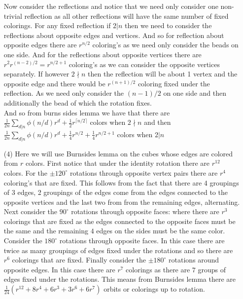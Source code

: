 \documentclass[12pt]{amsart}
\begin{document}
\begin{itemize}
Now consider the reflections and notice that we need only consider one non-trivial reflection as all other reflections will have the same number of fixed colorings. For any fixed reflection if $2|n$ then we need to consider the reflections about opposite edges and vertices. And so for reflection about opposite edges there are $r^{n/2}$ coloring's as we need only consider the beads on one side. And for the reflections about opposite vertices there are $r^{2}r^{(n-2)/2}=r^{n/2+1}$ coloring's as we can consider the opposite vertices separately. If however $2\nmid n$ then the reflection will be about 1 vertex and the opposite edge and there would be $r^{(n+1)/2}$ coloring fixed under the reflection. As we need only consider the $(n-1)/2$ on one side and then additionally the bead of which the rotation fixes.\\

And so from burns sides lemma we have that there are $\frac{1}{2n}\sum_{d|n}\phi(n/d)r^d+\frac{1}{2}r^{\lceil{n/2}\rceil}$ colors when $2\nmid n$ and then $\frac{1}{2n}\sum_{d|n}\phi(n/d)r^d+\frac{1}{4}r^{n/2}+\frac{1}{4}r^{n/2+1}$ colors when $2| n$\\


\item[(4)] %
Here we will use Burnsides lemma on the cubes whose edges are colored from $r$ colors. First notice that under the identity rotation there are $r^{12}$ colors. For the $\pm 120^\circ$ rotations through opposite vertex pairs there are $r^4$ coloring's that are fixed. This follows from the fact that there are 4 groupings of $3$ edges, 2 groupings of the edges come from the edges connected to the opposite vertices and the last two from from the remaining edges, alternating. Next consider the $90^\circ$ rotations through opposite faces: where there are $r^3$ colorings that are fixed as the edges connected to the opposite faces must be the same and the remaining $4$ edges on the sides must be the same color. Consider the $180^\circ$ rotations through opposite faces. In this case there are twice as many groupings of edges fixed under the rotations and so there are $r^{6}$ colorings that are fixed. Finally consider the $\pm 180^\circ$ rotations around opposite edges. In this case there are $r^7$ colorings as there are $7$ groups of edges fixed under the rotations. This means from Burnsides lemma there are $\frac{1}{24}(r^{12}+8r^4+6r^3+3r^6+6r^7)$ orbits or colorings up to rotation.\\


\end{itemize}
\end{document}
